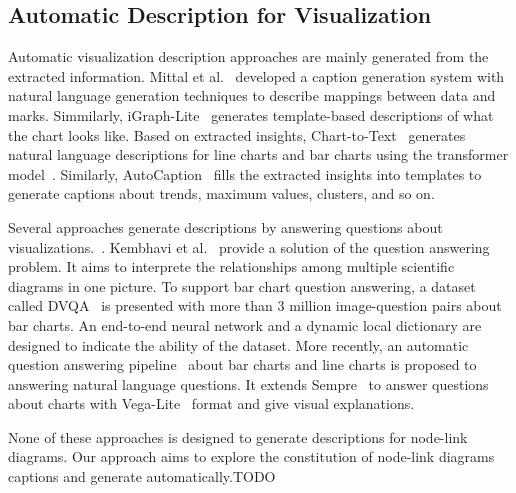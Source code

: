 \subsection{Automatic Description for Visualization}
Automatic visualization description approaches are mainly generated from the extracted information. Mittal et al.~\cite{DBLP:journals/coling/MittalMCR98} developed a caption generation system with natural language generation techniques to describe mappings between data and marks.
Simmilarly, iGraph-Lite~\cite{DBLP:journals/tochi/FerresLST13} generates template-based descriptions of what the chart looks like.
Based on extracted insights, Chart-to-Text~\cite{DBLP:conf/inlg/ObeidH20} generates natural language descriptions for line charts and bar charts using the transformer model~\cite{DBLP:conf/nips/VaswaniSPUJGKP17}. 
Similarly, AutoCaption~\cite{DBLP:conf/apvis/LiuXHWY20} fills the extracted insights into templates to generate captions about trends, maximum values, clusters, and so on. 

Several approaches generate descriptions by answering questions about visualizations.~\cite{DBLP:conf/cvpr/KaflePCK18, DBLP:conf/chi/KimHA20, DBLP:conf/eccv/KembhaviSKSHF16}.
Kembhavi et al.~\cite{DBLP:conf/eccv/KembhaviSKSHF16} provide a solution of the question answering problem. 
It aims to interprete the relationships among multiple scientific diagrams in one picture. 
To support bar chart question answering, a dataset called DVQA~\cite{DBLP:conf/cvpr/KaflePCK18} is presented with more than 3 million image-question pairs about bar charts. 
An end-to-end neural network and a dynamic local dictionary are designed to indicate the ability of the dataset.
More recently, an automatic question answering pipeline~\cite{DBLP:conf/chi/KimHA20} about bar charts and line charts is proposed to answering natural language questions. It extends Sempre~\cite{DBLP:conf/acl/PasupatL15, DBLP:conf/emnlp/ZhangPL17} to answer questions about charts with Vega-Lite~\cite{DBLP:journals/tvcg/SatyanarayanMWH17} format and give visual explanations.

None of these approaches is designed to generate descriptions for node-link diagrams. Our approach aims to explore the constitution of node-link diagrams captions and generate automatically.{\colorbox{text-highlight}{TODO}} %